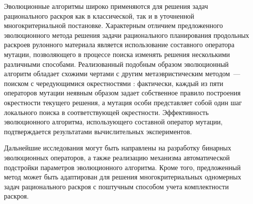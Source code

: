 \documentclass[12pt]{article}
\begin{document}
Эволюционные алгоритмы широко применяются для решения задач рационального 
раскроя как в классической, так и в уточненной многокритериальной постановке. 
Характерным отличием предложенного эволюционного метода решения задачи 
рационального планирования продольных раскроев рулонного материала является 
использование составного оператора мутации, позволяющего в процессе поиска 
изменять решения несколькими различными способами. Реализованный подобным 
образом эволюционный алгоритм обладает схожими чертами с другим 
метаэвристическим методом~--- поиском с чередующимися окрестностями 
\cite{mladenovic97}: 
фактически, каждый из пяти операторов мутации неявным образом задает 
собственное правило построения окрестности текущего решения, а мутация особи 
представляет собой один шаг локального поиска в соответствующей окрестности. 
Эффективность эволюционного алгоритма, использующего составной оператор 
мутации, подтверждается результатами вычислительных экспериментов.

Дальнейшие исследования могут быть направлены на разработку бинарных 
эволюционных операторов, а также реализацию механизма автоматической 
подстройки параметров эволюционного алгоритма. Кроме того, предложенный метод 
может быть адаптирован для решения многокритериальных одномерных задач 
рационального раскроя с поштучным способом учета комплектности раскроя.
\end{document}
